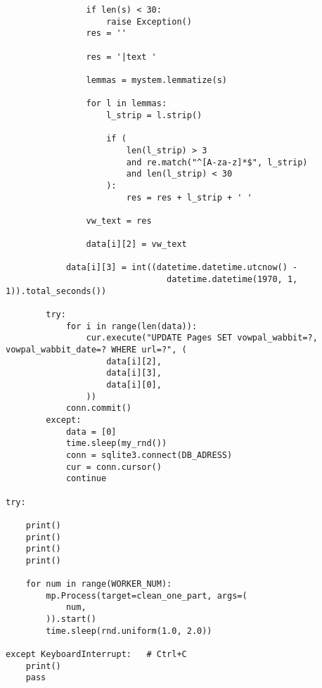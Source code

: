 \documentclass[a4paper,14pt]{extreport}
\begin{document}
\begin{lstlisting}
                if len(s) < 30:
                    raise Exception()
                res = ''

                res = '|text '

                lemmas = mystem.lemmatize(s)

                for l in lemmas:
                    l_strip = l.strip()

                    if (
                        len(l_strip) > 3
                        and re.match("^[A-za-z]*$", l_strip)
                        and len(l_strip) < 30
                    ):
                        res = res + l_strip + ' '

                vw_text = res

                data[i][2] = vw_text

            data[i][3] = int((datetime.datetime.utcnow() -
                                datetime.datetime(1970, 1, 1)).total_seconds())

        try:
            for i in range(len(data)):
                cur.execute("UPDATE Pages SET vowpal_wabbit=?, vowpal_wabbit_date=? WHERE url=?", (
                    data[i][2],		
                    data[i][3],		
                    data[i][0],		
                ))
            conn.commit()
        except:
            data = [0]
            time.sleep(my_rnd())
            conn = sqlite3.connect(DB_ADRESS)
            cur = conn.cursor()
            continue

try:

    print()
    print()
    print()
    print()
    
    for num in range(WORKER_NUM):
        mp.Process(target=clean_one_part, args=(
            num,
        )).start()
        time.sleep(rnd.uniform(1.0, 2.0))

except KeyboardInterrupt:	# Ctrl+C
    print()
    pass
    
\end{lstlisting}

\end{document}
